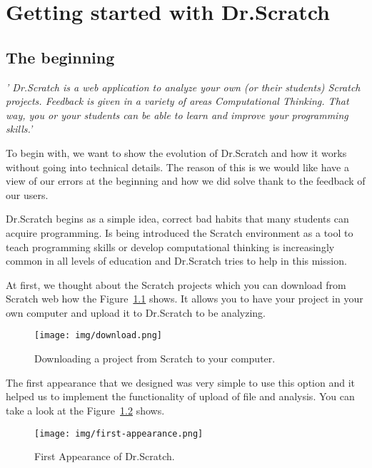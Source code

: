 \documentclass[a4paper, 12pt]{book}
\begin{document}
\cleardoublepage
{} %
\chapter{Getting started with Dr.Scratch}
\label{sec:beginning} %
\section{The beginning} 
\setlength{\parskip}{8mm}

\textsl{'
Dr.Scratch is a web application to analyze your own (or their students) Scratch
projects. Feedback is given in a variety of areas Computational Thinking. That
way, you or your students can be able to learn and improve your programming
skills.'}

To begin with, we want to show the evolution of Dr.Scratch and how it works
without going into technical details. The reason of this is we would like have
a view of our errors at the beginning and how we did solve thank to the
feedback of our users.

Dr.Scratch begins as a simple idea, correct bad habits that many students can
acquire programming. Is being introduced the Scratch environment as a tool to
teach programming skills or develop computational thinking is increasingly
common in all levels of education and Dr.Scratch tries to help in this mission.
 
At first, we thought about the Scratch projects which you can download from
Scratch web how the Figure~\ref{figure:download} shows. It allows you to have your project in your own computer and upload it to
Dr.Scratch to be analyzing. 
 
\begin{figure}
    \centering
    \texttt{[image: img/download.png]}
    \caption{Downloading a project from Scratch to your computer.}
    \label{figure:download}
\end{figure}

The first appearance that we designed was very simple to use this option and it 
helped us to implement the functionality of upload of file and analysis. You
can take a look at the Figure~\ref{figure:first-appearance} shows.

 \begin{figure}
   	\centering
   	\texttt{[image: img/first-appearance.png]}
   	\caption{First Appearance of Dr.Scratch.}
   	\label{figure:first-appearance}
\end{figure}
 
\end{document}
